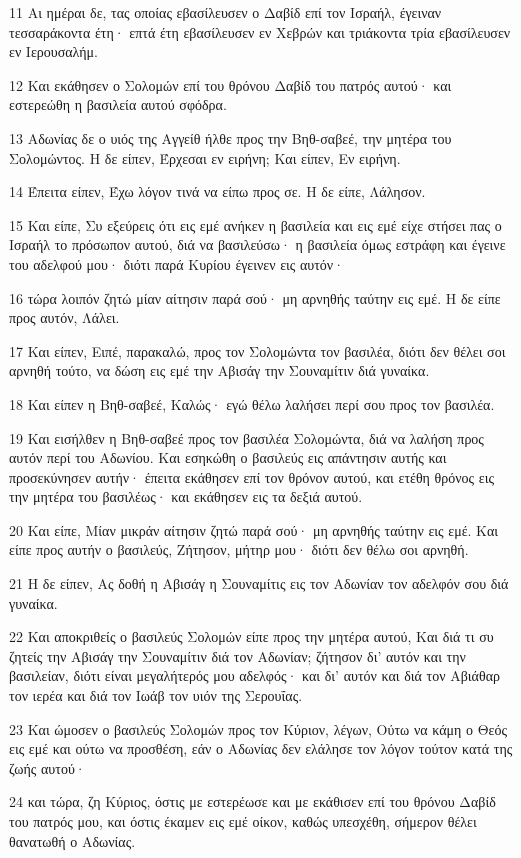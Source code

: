 \par 11 Αι ημέραι δε, τας οποίας εβασίλευσεν ο Δαβίδ επί τον Ισραήλ, έγειναν τεσσαράκοντα έτη· επτά έτη εβασίλευσεν εν Χεβρών και τριάκοντα τρία εβασίλευσεν εν Ιερουσαλήμ.
\par 12 Και εκάθησεν ο Σολομών επί του θρόνου Δαβίδ του πατρός αυτού· και εστερεώθη η βασιλεία αυτού σφόδρα.
\par 13 Αδωνίας δε ο υιός της Αγγείθ ήλθε προς την Βηθ-σαβεέ, την μητέρα του Σολομώντος. Η δε είπεν, Έρχεσαι εν ειρήνη; Και είπεν, Εν ειρήνη.
\par 14 Έπειτα είπεν, Έχω λόγον τινά να είπω προς σε. Η δε είπε, Λάλησον.
\par 15 Και είπε, Συ εξεύρεις ότι εις εμέ ανήκεν η βασιλεία και εις εμέ είχε στήσει πας ο Ισραήλ το πρόσωπον αυτού, διά να βασιλεύσω· η βασιλεία όμως εστράφη και έγεινε του αδελφού μου· διότι παρά Κυρίου έγεινεν εις αυτόν·
\par 16 τώρα λοιπόν ζητώ μίαν αίτησιν παρά σού· μη αρνηθής ταύτην εις εμέ. Η δε είπε προς αυτόν, Λάλει.
\par 17 Και είπεν, Ειπέ, παρακαλώ, προς τον Σολομώντα τον βασιλέα, διότι δεν θέλει σοι αρνηθή τούτο, να δώση εις εμέ την Αβισάγ την Σουναμίτιν διά γυναίκα.
\par 18 Και είπεν η Βηθ-σαβεέ, Καλώς· εγώ θέλω λαλήσει περί σου προς τον βασιλέα.
\par 19 Και εισήλθεν η Βηθ-σαβεέ προς τον βασιλέα Σολομώντα, διά να λαλήση προς αυτόν περί του Αδωνίου. Και εσηκώθη ο βασιλεύς εις απάντησιν αυτής και προσεκύνησεν αυτήν· έπειτα εκάθησεν επί τον θρόνον αυτού, και ετέθη θρόνος εις την μητέρα του βασιλέως· και εκάθησεν εις τα δεξιά αυτού.
\par 20 Και είπε, Μίαν μικράν αίτησιν ζητώ παρά σού· μη αρνηθής ταύτην εις εμέ. Και είπε προς αυτήν ο βασιλεύς, Ζήτησον, μήτηρ μου· διότι δεν θέλω σοι αρνηθή.
\par 21 Η δε είπεν, Ας δοθή η Αβισάγ η Σουναμίτις εις τον Αδωνίαν τον αδελφόν σου διά γυναίκα.
\par 22 Και αποκριθείς ο βασιλεύς Σολομών είπε προς την μητέρα αυτού, Και διά τι συ ζητείς την Αβισάγ την Σουναμίτιν διά τον Αδωνίαν; ζήτησον δι' αυτόν και την βασιλείαν, διότι είναι μεγαλήτερός μου αδελφός· και δι' αυτόν και διά τον Αβιάθαρ τον ιερέα και διά τον Ιωάβ τον υιόν της Σερουΐας.
\par 23 Και ώμοσεν ο βασιλεύς Σολομών προς τον Κύριον, λέγων, Ούτω να κάμη ο Θεός εις εμέ και ούτω να προσθέση, εάν ο Αδωνίας δεν ελάλησε τον λόγον τούτον κατά της ζωής αυτού·
\par 24 και τώρα, ζη Κύριος, όστις με εστερέωσε και με εκάθισεν επί του θρόνου Δαβίδ του πατρός μου, και όστις έκαμεν εις εμέ οίκον, καθώς υπεσχέθη, σήμερον θέλει θανατωθή ο Αδωνίας.
